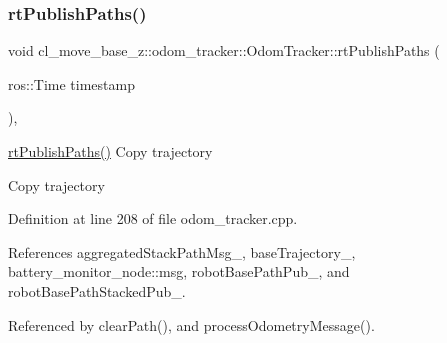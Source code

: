 \mbox{\label{classcl__move__base__z_1_1odom__tracker_1_1OdomTracker_a8f728f85d1f3f49f4b94e37052a59d6d}} 
\subsubsection{\texorpdfstring{rt\+Publish\+Paths()}{rtPublishPaths()}}
{\footnotesize\ttfamily void cl\+\_\+move\+\_\+base\+\_\+z\+::odom\+\_\+tracker\+::\+Odom\+Tracker\+::rt\+Publish\+Paths (\begin{DoxyParamCaption}\item[{ros\+::\+Time}]{timestamp }\end{DoxyParamCaption})\hspace{0.3cm}{\ttfamily [protected]}, {\ttfamily [virtual]}}

\hyperlink{classcl__move__base__z_1_1odom__tracker_1_1OdomTracker_a8f728f85d1f3f49f4b94e37052a59d6d}{rt\+Publish\+Paths()} Copy trajectory

Copy trajectory 

Definition at line 208 of file odom\+\_\+tracker.\+cpp.



References aggregated\+Stack\+Path\+Msg\+\_\+, base\+Trajectory\+\_\+, battery\+\_\+monitor\+\_\+node\+::msg, robot\+Base\+Path\+Pub\+\_\+, and robot\+Base\+Path\+Stacked\+Pub\+\_\+.



Referenced by clear\+Path(), and process\+Odometry\+Message().



